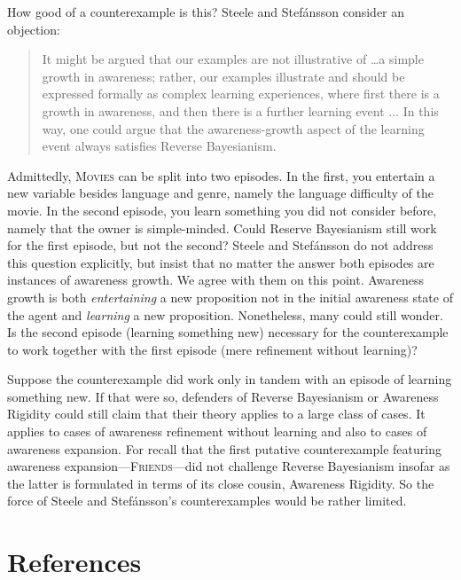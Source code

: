 \documentclass[
  11pt,
  dvipsnames,enabledeprecatedfontcommands]{scrartcl}
\begin{document}
How good of a counterexample is this? Steele and Stefánsson consider an
objection:

\begin{quote}It might be argued that our examples are not illustrative of \dots a simple growth in awareness; rather, our examples illustrate and should be expressed 
  formally as complex learning experiences, where first there is a growth in awareness, and then 
  there is a further learning event ... In this way, one could argue that the awareness-growth 
  aspect of the learning event always satisfies Reverse Bayesianism.
\end{quote}

\doublespace

\noindent  Admittedly, \textsc{Movies} can be split into two episodes.
In the first, you entertain a new variable besides language and genre,
namely the language difficulty of the movie. In the second episode, you
learn something you did not consider before, namely that the owner is
simple-minded. Could Reserve Bayesianism still work for the first
episode, but not the second? Steele and Stefánsson do not address this
question explicitly, but insist that no matter the answer both episodes
are instances of awareness growth. We agree with them on this point.
Awareness growth is both \textit{entertaining} a new proposition not in
the initial awareness state of the agent and \textit{learning} a new
proposition. Nonetheless, many could still wonder. Is the second episode
(learning something new) necessary for the counterexample to work
together with the first episode (mere refinement without learning)?

Suppose the counterexample did work only in tandem with an episode of
learning something new. If that were so, defenders of Reverse
Bayesianism or Awareness Rigidity could still claim that their theory
applies to a large class of cases. It applies to cases of awareness
refinement without learning and also to cases of awareness expansion.
For recall that the first putative counterexample featuring awareness
expansion---\textsc{Friends}---did not challenge Reverse Bayesianism
insofar as the latter is formulated in terms of its close cousin,
Awareness Rigidity. So the force of Steele and Stefánsson's
counterexamples would be rather limited.

\singlespace

\hypertarget{references}{%
\section*{References}\label{references}}
\end{document}
